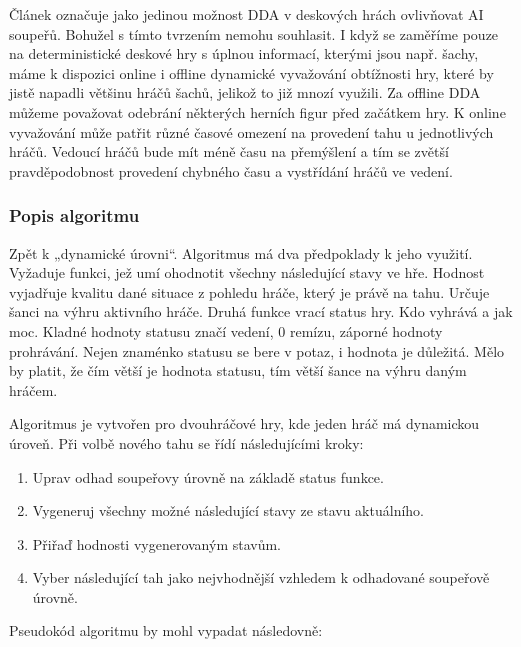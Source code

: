 Článek označuje jako jedinou možnost DDA v deskových hrách ovlivňovat AI soupeřů. Bohužel s tímto tvrzením nemohu souhlasit. I když se zaměříme pouze na deterministické deskové hry s úplnou informací, kterými jsou např. šachy, máme k dispozici online i offline dynamické vyvažování obtížnosti hry, které by jistě napadli většinu hráčů šachů, jelikož to již mnozí využili. Za offline DDA můžeme považovat odebrání některých herních figur před začátkem hry. K online vyvažování může patřit různé časové omezení na provedení tahu u jednotlivých hráčů. Vedoucí hráčů bude mít méně času na přemýšlení a tím se zvětší pravděpodobnost provedení chybného času a vystřídání hráčů ve vedení.

\subsubsection{Popis algoritmu}

Zpět k „dynamické úrovni“. Algoritmus má dva předpoklady k jeho využití. Vyžaduje funkci, jež umí ohodnotit všechny následující stavy ve hře. Hodnost vyjadřuje kvalitu dané situace z pohledu hráče, který je právě na tahu. Určuje šanci na výhru aktivního hráče.
Druhá funkce vrací status hry. Kdo vyhrává a jak moc. Kladné hodnoty statusu značí vedení, 0 remízu, záporné hodnoty prohrávání. Nejen znaménko statusu se bere v potaz, i hodnota je důležitá. Mělo by platit, že čím větší je hodnota statusu, tím větší šance na výhru daným hráčem.

Algoritmus je vytvořen pro dvouhráčové hry, kde jeden hráč má dynamickou úroveň. Při volbě nového tahu se řídí následujícími kroky:


\begin{enumerate}
	\item Uprav odhad soupeřovy úrovně na základě status funkce.
	\item Vygeneruj všechny možné následující stavy ze stavu aktuálního.
	\item Přiřaď hodnosti vygenerovaným stavům.
	\item Vyber následující tah jako nejvhodnější vzhledem k odhadované soupeřově úrovně.
\end{enumerate}

Pseudokód algoritmu by mohl vypadat následovně:

